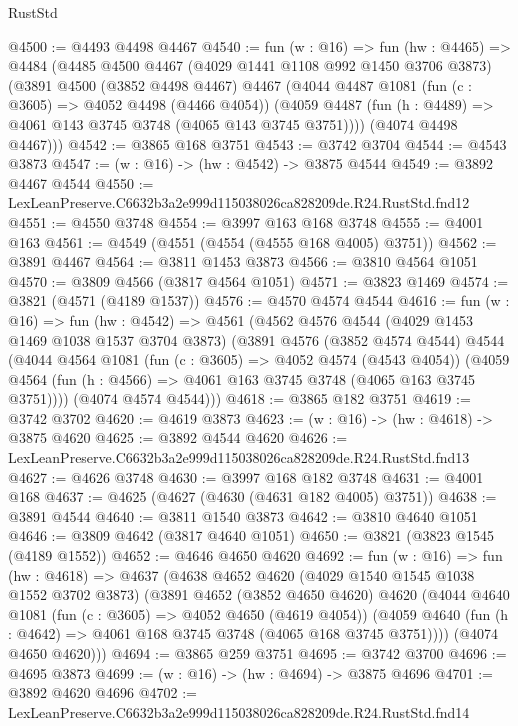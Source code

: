 \begin{lexlean}{RustStd}
\begin{coremodule}
@4500 := @4493 @4498 @4467
@4540 := fun (w : @16) =>
  fun (hw : @4465) =>
  @4484
    (@4485
      @4500
      @4467
      (@4029 @1441 @1108 @992 @1450 @3706 @3873)
      (@3891
        @4500
        (@3852 @4498 @4467)
        @4467
        (@4044
          @4487
          @1081
          (fun (c : @3605) => @4052 @4498 (@4466 @4054))
          (@4059 @4487 (fun (h : @4489) => @4061 @143 @3745 @3748 (@4065 @143 @3745 @3751))))
        (@4074 @4498 @4467)))
@4542 := @3865 @168 @3751
@4543 := @3742 @3704
@4544 := @4543 @3873
@4547 := (w : @16) -> (hw : @4542) -> @3875 @4544
@4549 := @3892 @4467 @4544
@4550 := LexLeanPreserve.C6632b3a2e999d115038026ca828209de.R24.RustStd.fnd12
@4551 := @4550 @3748
@4554 := @3997 @163 @168 @3748
@4555 := @4001 @163
@4561 := @4549 (@4551 (@4554 (@4555 @168 @4005) @3751))
@4562 := @3891 @4467
@4564 := @3811 @1453 @3873
@4566 := @3810 @4564 @1051
@4570 := @3809 @4566 (@3817 @4564 @1051)
@4571 := @3823 @1469
@4574 := @3821 (@4571 (@4189 @1537))
@4576 := @4570 @4574 @4544
@4616 := fun (w : @16) =>
  fun (hw : @4542) =>
  @4561
    (@4562
      @4576
      @4544
      (@4029 @1453 @1469 @1038 @1537 @3704 @3873)
      (@3891
        @4576
        (@3852 @4574 @4544)
        @4544
        (@4044
          @4564
          @1081
          (fun (c : @3605) => @4052 @4574 (@4543 @4054))
          (@4059 @4564 (fun (h : @4566) => @4061 @163 @3745 @3748 (@4065 @163 @3745 @3751))))
        (@4074 @4574 @4544)))
@4618 := @3865 @182 @3751
@4619 := @3742 @3702
@4620 := @4619 @3873
@4623 := (w : @16) -> (hw : @4618) -> @3875 @4620
@4625 := @3892 @4544 @4620
@4626 := LexLeanPreserve.C6632b3a2e999d115038026ca828209de.R24.RustStd.fnd13
@4627 := @4626 @3748
@4630 := @3997 @168 @182 @3748
@4631 := @4001 @168
@4637 := @4625 (@4627 (@4630 (@4631 @182 @4005) @3751))
@4638 := @3891 @4544
@4640 := @3811 @1540 @3873
@4642 := @3810 @4640 @1051
@4646 := @3809 @4642 (@3817 @4640 @1051)
@4650 := @3821 (@3823 @1545 (@4189 @1552))
@4652 := @4646 @4650 @4620
@4692 := fun (w : @16) =>
  fun (hw : @4618) =>
  @4637
    (@4638
      @4652
      @4620
      (@4029 @1540 @1545 @1038 @1552 @3702 @3873)
      (@3891
        @4652
        (@3852 @4650 @4620)
        @4620
        (@4044
          @4640
          @1081
          (fun (c : @3605) => @4052 @4650 (@4619 @4054))
          (@4059 @4640 (fun (h : @4642) => @4061 @168 @3745 @3748 (@4065 @168 @3745 @3751))))
        (@4074 @4650 @4620)))
@4694 := @3865 @259 @3751
@4695 := @3742 @3700
@4696 := @4695 @3873
@4699 := (w : @16) -> (hw : @4694) -> @3875 @4696
@4701 := @3892 @4620 @4696
@4702 := LexLeanPreserve.C6632b3a2e999d115038026ca828209de.R24.RustStd.fnd14

\end{coremodule}
\end{lexlean}
